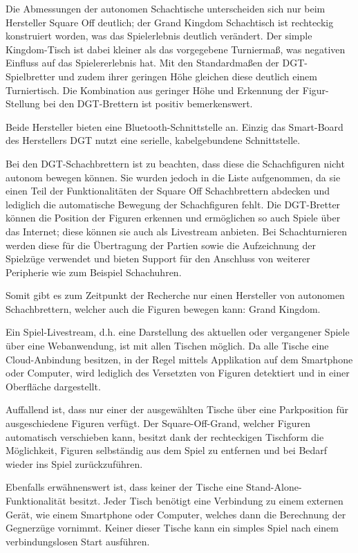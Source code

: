 Die Abmessungen der autonomen Schachtische unterscheiden sich nur beim
Hersteller Square Off deutlich; der Grand Kingdom Schachtisch ist
rechteckig konstruiert worden, was das Spielerlebnis deutlich verändert.
Der simple Kingdom-Tisch ist dabei kleiner als das vorgegebene
Turniermaß, was negativen Einfluss auf das Spielererlebnis hat. Mit den
Standardmaßen der DGT-Spielbretter und zudem ihrer geringen Höhe
gleichen diese deutlich einem Turniertisch. Die Kombination aus geringer
Höhe und Erkennung der Figur-Stellung bei den DGT-Brettern ist positiv
bemerkenswert.

Beide Hersteller bieten eine Bluetooth-Schnittstelle an. Einzig das
Smart-Board des Herstellers DGT nutzt eine serielle, kabelgebundene
Schnittstelle.

Bei den DGT-Schachbrettern ist zu beachten, dass diese die Schachfiguren
nicht autonom bewegen können. Sie wurden jedoch in die Liste
aufgenommen, da sie einen Teil der Funktionalitäten der Square Off
Schachbrettern abdecken und lediglich die automatische Bewegung der
Schachfiguren fehlt. Die DGT-Bretter können die Position der Figuren
erkennen und ermöglichen so auch Spiele über das Internet; diese können
sie auch als Livestream anbieten. Bei Schachturnieren werden diese für
die Übertragung der Partien sowie die Aufzeichnung der Spielzüge
verwendet und bieten Support für den Anschluss von weiterer Peripherie
wie zum Beispiel Schachuhren.

Somit gibt es zum Zeitpunkt der Recherche nur einen Hersteller von
autonomen Schachbrettern, welcher auch die Figuren bewegen kann: Grand
Kingdom.

Ein Spiel-Livestream, d.h. eine Darstellung des aktuellen oder
vergangener Spiele über eine Webanwendung, ist mit allen Tischen
möglich. Da alle Tische eine Cloud-Anbindung besitzen, in der Regel
mittels Applikation auf dem Smartphone oder Computer, wird lediglich des
Versetzten von Figuren detektiert und in einer Oberfläche dargestellt.

Auffallend ist, dass nur einer der ausgewählten Tische über eine
Parkposition für ausgeschiedene Figuren verfügt. Der Square-Off-Grand,
welcher Figuren automatisch verschieben kann, besitzt dank der
rechteckigen Tischform die Möglichkeit, Figuren selbständig aus dem
Spiel zu entfernen und bei Bedarf wieder ins Spiel zurückzuführen.

Ebenfalls erwähnenswert ist, dass keiner der Tische eine
Stand-Alone-Funktionalität besitzt. Jeder Tisch benötigt eine Verbindung
zu einem externen Gerät, wie einem Smartphone oder Computer, welches
dann die Berechnung der Gegnerzüge vornimmt. Keiner dieser Tische kann
ein simples Spiel nach einem verbindungslosen Start ausführen.

